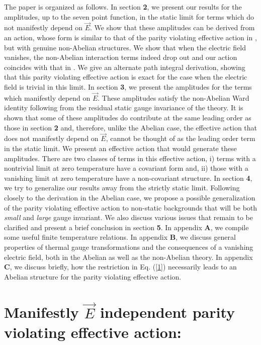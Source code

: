 \documentclass[a4paper,12pt]{article}
\begin{document}
The paper is organized as follows. In section {\bf 2}, we present our
results for the amplitudes, up to the seven point function, in the
static limit for terms which do not manifestly depend on $\vec{E}$. We
show  that these
amplitudes can be derived from an action, whose form is similar to that
of the parity violating effective action in \cite{fosco:1997vu},
but with genuine non-Abelian structures. We show that when the electric field
vanishes, the non-Abelian interaction terms indeed drop out and our
action coincides  with that in
\cite{fosco:1997vu}.  We give an
alternate  path integral derivation,
showing that this parity violating effective action is exact for the 
case when the electric field is trivial in this limit. In
section {\bf 3}, we present the amplitudes for the terms which
manifestly depend on $\vec{E}$. These amplitudes satisfy the
non-Abelian Ward identity following from the residual static gauge
invariance of the theory. It is shown that some of these amplitudes do
contribute at the same leading order as those in section {\bf 2} and,
therefore, unlike the Abelian case, the effective action that does not
manifestly depend on $\vec{E}$, cannot be thought of as the leading
order  term in 
the static limit. We present an effective action that would generate 
these amplitudes. There are two classes of terms in this effective
action, i) terms with a nontrivial limit at zero temperature have a 
covariant form and, ii) those with a vanishing limit at zero 
temperature have a non-covariant structure. In section {\bf 4},
we try to generalize our results away from the strictly static limit.
Following closely to the derivation in the Abelian case, we propose a
possible generalization of the parity 
violating effective action to non-static backgrounds that will be
both {\it small} and {\it large} gauge invariant. We also discuss
various issues that remain to be clarified and present a brief
conclusion in section {\bf 5}. In 
appendix {\bf A}, we compile some useful finite temperature relations.
In appendix {\bf B}, we discuss general
properties of thermal gauge transformations and the consequences of a
vanishing electric field, both in the Abelian as well as the
non-Abelian theory. In appendix {\bf C}, we discuss briefly,
how the restriction in Eq. (\ref{1}) necessarily leads to an Abelian
structure for the parity violating effective action.

\section{Manifestly $\vec{E}$ independent parity violating effective
action:} 
\end{document}

